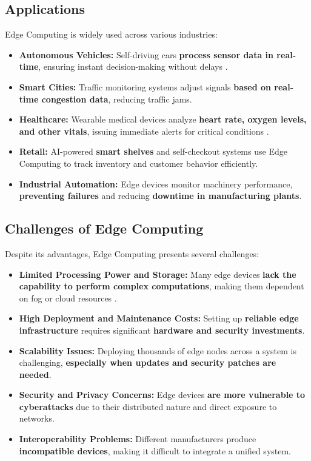 \documentclass[a4paper,12pt]{article}
\begin{document}
	\subsection{Applications}
	Edge Computing is widely used across various industries:
	\begin{itemize}
		\item \textbf{Autonomous Vehicles:} Self-driving cars \textbf{process sensor data in real-time}, ensuring instant decision-making without delays \cite{bonomi2012fog}.
		\item \textbf{Smart Cities:} Traffic monitoring systems adjust signals \textbf{based on real-time congestion data}, reducing traffic jams.
		\item \textbf{Healthcare:} Wearable medical devices analyze \textbf{heart rate, oxygen levels, and other vitals}, issuing immediate alerts for critical conditions \cite{cisco2015fog}.
		\item \textbf{Retail:} AI-powered \textbf{smart shelves} and self-checkout systems use Edge Computing to track inventory and customer behavior efficiently.
		\item \textbf{Industrial Automation:} Edge devices monitor machinery performance, \textbf{preventing failures} and reducing \textbf{downtime in manufacturing plants}.
	\end{itemize}
	
	\subsection{Challenges of Edge Computing}
	Despite its advantages, Edge Computing presents several challenges:
	
	\begin{itemize}
		\item \textbf{Limited Processing Power and Storage:} Many edge devices \textbf{lack the capability to perform complex computations}, making them dependent on fog or cloud resources \cite{weber2021edge}.
		\item \textbf{High Deployment and Maintenance Costs:} Setting up \textbf{reliable edge infrastructure} requires significant \textbf{hardware and security investments}.
		\item \textbf{Scalability Issues:} Deploying thousands of edge nodes across a system is challenging, \textbf{especially when updates and security patches are needed}.
		\item \textbf{Security and Privacy Concerns:} Edge devices \textbf{are more vulnerable to cyberattacks} due to their distributed nature and direct exposure to networks.
		\item \textbf{Interoperability Problems:} Different manufacturers produce \textbf{incompatible devices}, making it difficult to integrate a unified system.
	\end{itemize}
	
\end{document}
